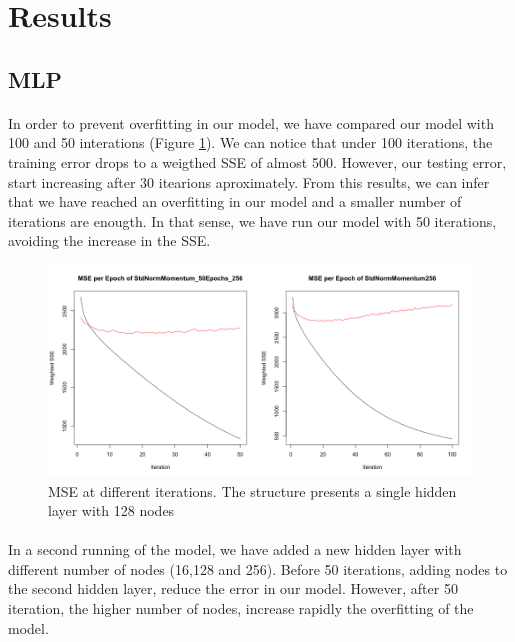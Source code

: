\documentclass[11.5pt]{article}
\newcounter{Figure}
\newcounter{graphics}
\begin{document}
\section{Results}
\subsection{MLP}
\paragraph{} In order to prevent overfitting in our model, we have compared our model with 100 and 50 interations (Figure \ref{50_100_256.png}). We can notice that under 100 iterations, the training error drops to a weigthed SSE of almost 500. However, our testing error, start increasing after 30 itearions aproximately. From this results, we can infer that we have reached an overfitting in our model and a smaller number of iterations are enougth. In that sense, we have run our model with 50 iterations, avoiding the increase in the SSE.
 

\begin{figure}[h!]
 \includegraphics[width=1\textwidth]{report_mlp/50_100_256.png}
  \caption{\small MSE at different iterations. The structure presents a single hidden layer with 128 nodes}
  \label{50_100_256.png}
\end{figure}


\paragraph{} In a second running of the model, we have added a new hidden layer  with different number of nodes (16,128 and 256). Before 50 iterations, adding nodes to the second hidden layer, reduce the error in our model. However, after 50 iteration, the higher number of nodes, increase rapidly the overfitting  of the model. 
\end{document}
